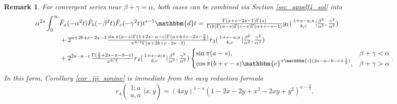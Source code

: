 \documentclass[12pt]{article}
\newcommand{\ee}[0] {\mathbbm{e}}
\newcommand{\ii}[0] {\mathbbm{i}}
\newcommand{\dd}[0] {\mathbbm{d}}
\numberwithin{equation}{section}
\newtheorem{remark}[theorem]{Remark}
\newcommand{\ArgS}[3] {( \begin{smallmatrix} #1 \\ #2 \end{smallmatrix} | {#3})}
\newcommand{\HypJreg}[2] {{\tilde{F}}_{#1}(#2)}
\begin{document}
\begin{remark}
For convergent series near $\beta+\gamma=\alpha$, both cases can be combined via Section \ref{sec_appelf4_sol} into
\begin{align*}
\alpha^{2s} \int_{0}^{\infty} & \HypJreg{a}{-\alpha^2 t} \HypJreg{b}{-\beta^2 t} \HypJreg{c}{-\gamma^2 t} t^{s-1} \dd t
 = \tfrac{\Gamma(a+c-2s-1)\Gamma(s)}{\Gamma(b)\Gamma(a-s)\Gamma(c-s)\Gamma(a+c-s-1)} g_1 \ArgS{1+s-a;s}{b,c}{\tfrac{\beta^2}{\alpha^2},\tfrac{\gamma^2}{\alpha^2}}\\
&+2^{a+2b+c-2s-3} \tfrac{\sin \pi  (a-s) \Gamma (1+2s-a-c) \Gamma(a+b+c-2s-\frac{3}{2})}{\pi ^{3/2} \Gamma (a+2 b+c-2 s-2)}  r_3 \ArgS{1+s-a;s}{b,c}{\tfrac{\beta^2}{\alpha^2},\tfrac{\gamma^2}{\alpha^2}}\\
&+2^{2s-a-c} \tfrac{\Gamma(\frac32 + 2s-a-b-c)}{\pi ^{3/2}} r_4 \ArgS{1+s-a;s}{b,c}{\tfrac{\beta^2}{\alpha^2},\tfrac{\gamma^2}{\alpha^2}}
\begin{cases}
\sin \pi (a-s)\text{,} & \beta + \gamma < \alpha \\
\cos \pi(b+c-s) \ee^{\pi \ii (2s-a-b-c+\frac12)}\text{,} & \beta + \gamma > \alpha 
\end{cases}
\text{.}
\end{align*}
In this form, Corollary \ref{cor_jjj_sonine} is immediate from the easy reduction formula
\begin{equation*}
r_4 \ArgS{1;a}{a,a}{x,y} = (4 x y)^{1-a} (1-2 x-2y+x^2-2 x y+y^2)^{a-\frac{3}{2}}\text{.}
\end{equation*}
\end{remark}
\end{document}
